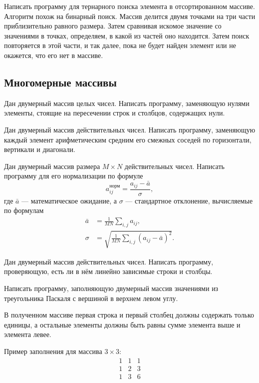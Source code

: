 \task Написать программу для тернарного поиска
элемента в отсортированном массиве. Алгоритм похож на бинарный
поиск. Массив делится двумя точками на три части приблизительно
равного размера. Затем сравнивая искомое значение со значениями в
точках, определяем, в какой из частей оно находится. Затем поиск
повторяется в этой части, и так далее, пока не будет найден элемент
или не окажется, что его нет в массиве.


\subsection{Многомерные массивы}

\task Дан двумерный массив целых чисел. Написать программу, заменяющую
нулями элементы, стоящие на пересечении строк и столбцов, содержащих нули.

\task Дан двумерный массив действительных чисел. Написать программу,
заменяющую каждый элемент арифметическим средним его смежных соседей
по горизонтали, вертикали и диагонали.

\task Дан двумерный массив размера $M\times N$ действительных
чисел. Написать программу для его нормализации по формуле
\[
a_{ij}^\textrm{норм} = \frac{a_{ij}-\bar{a}}{\sigma},
\]
где $\bar{a}$ — математическое ожидание, а $\sigma$ — стандартное
отклонение, вычисляемые по формулам
\begin{align*}
  \bar{a} &= \frac{1}{MN}\sum_{i,j}a_{ij},\\
  \sigma  &= \sqrt{\frac{1}{MN}\sum_{i,j}(a_{ij}-\bar{a})^2}. 
\end{align*}

\task Дан двумерный массив действительных чисел. Написать программу,
проверяющую, есть ли в нём линейно зависимые строки и столбцы.

\task Написать программу, заполняющую двумерный массив значениями из
треугольника Паскаля с вершиной в верхнем
левом углу.

В полученном массиве первая строка и первый столбец должны содержать
только единицы, а остальные элементы должны быть равны сумме элемента
выше и элемента левее.

Пример заполнения для массива $3\times 3$:
\[
\begin{array}{ccc}
  1 & 1 & 1 \\
  1 & 2 & 3 \\
  1 & 3 & 6
\end{array}
\]

